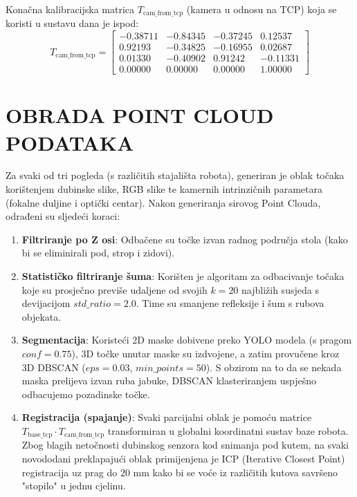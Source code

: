 \documentclass[12pt,a4paper]{article}
\begin{document}
Konačna kalibracijska matrica $T_{\text{cam\_from\_tcp}}$ (kamera u odnosu na TCP) koja se koristi u sustavu dana je ispod:
\begin{equation}
T_{\text{cam\_from\_tcp}} = \begin{bmatrix}
-0.38711 & -0.84345 & -0.37245 & 0.12537 \\
 0.92193 & -0.34825 & -0.16955 & 0.02687 \\
 0.01330 & -0.40902 &  0.91242 & -0.11331 \\
 0.00000 &  0.00000 &  0.00000 & 1.00000
\end{bmatrix}
\end{equation}

\section{OBRADA POINT CLOUD PODATAKA}
Za svaki od tri pogleda (s različitih stajališta robota), generiran je oblak točaka korištenjem dubinske slike, RGB slike te kamernih intrinzičnih parametara (fokalne duljine i optički centar). Nakon generiranja sirovog Point Clouda, odrađeni su sljedeći koraci:
\begin{enumerate}
    \item \textbf{Filtriranje po Z osi}: Odbačene su točke izvan radnog područja stola (kako bi se eliminirali pod, strop i zidovi).
    \item \textbf{Statističko filtriranje šuma}: Korišten je algoritam za odbacivanje točaka koje su prosječno previše udaljene od svojih $k=20$ najbližih susjeda s devijacijom $std\_ratio=2.0$. Time su smanjene refleksije i šum s rubova objekata.
    \item \textbf{Segmentacija}: Koristeći 2D maske dobivene preko YOLO modela (s pragom $conf=0.75$), 3D točke unutar maske su izdvojene, a zatim provučene kroz 3D DBSCAN ($eps=0.03$, $min\_points=50$). S obzirom na to da se nekada maska prelijeva izvan ruba jabuke, DBSCAN klasteriranjem uspješno odbacujemo pozadinske točke.
    \item \textbf{Registracija (spajanje)}: Svaki parcijalni oblak je pomoću matrice $T_{\text{base\_tcp}} \cdot T_{\text{cam\_from\_tcp}}$ transformiran u globalni koordinatni sustav baze robota. Zbog blagih netočnosti dubinskog senzora kod snimanja pod kutem, na svaki novododani preklapajući oblak primijenjena je ICP (Iterative Closest Point) registracija uz prag do $20$ mm kako bi se voće iz različitih kutova savršeno "stopilo" u jednu cjelinu.
\end{enumerate}
\end{document}
